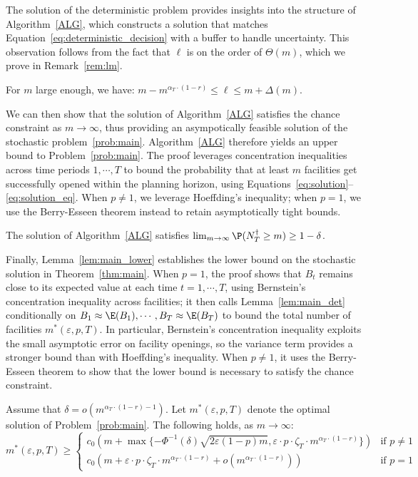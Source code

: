 \documentclass[blindrev]{informs3noheader}
\begin{document}
The solution of the deterministic problem provides insights into the structure of Algorithm~\ref{ALG}, which constructs a solution that matches Equation~\eqref{eq:deterministic_decision} with a buffer to handle uncertainty. This observation follows from the fact that $\ell$ is on the order of $\Theta(m)$, which we prove in Remark~\ref{rem:lm}.
\begin{remark}\label{rem:lm}
 For $m$ large enough, we have: $m- m^{\alpha_T \cdot (1-r)} \leq \ell\leq m + \Delta(m)$.
\end{remark}

We can then show that the solution of Algorithm~\ref{ALG} satisfies the chance constraint as $m\to\infty$, thus providing an asympotically feasible solution of the stochastic problem~\eqref{prob:main}. Algorithm~\ref{ALG} therefore yields an upper bound to Problem~\eqref{prob:main}. The proof leverages concentration inequalities across time periods $1,\cdots,T$  to bound the probability that at least $m$ facilities get successfully opened within the planning horizon, using Equations~\eqref{eq:solution}--\eqref{eq:solution_eq}. When $p\neq 1$, we leverage Hoeffding's inequality; when $p=1$, we use the Berry-Esseen theorem instead to retain asymptotically tight bounds.

\begin{lemma}\label{lem:main_feasible}
The solution of Algorithm~\ref{ALG} satisfies $\lim_{m \to \infty} \P(N^\dagger_T \geq m) \geq 1-\delta$.
\end{lemma}

Finally, Lemma~\ref{lem:main_lower} establishes the lower bound on the stochastic solution in Theorem~\ref{thm:main}. When $p=1$, the proof shows that $B_t$ remains close to its expected value at each time $t=1,\cdots,T$, using Bernstein's concentration inequality across facilities; it then calls Lemma~\ref{lem:main_det} conditionally on $B_1\approx\E(B_1),\cdots,B_T\approx\E(B_T)$ to bound the total number of facilities $m^*(\varepsilon, p,T)$. In particular, Bernstein's concentration inequality exploits the small asymptotic error on facility openings, so the variance term provides a stronger bound than with Hoeffding's inequality.  When $p\neq1$, it uses the Berry-Esseen theorem to show that the lower bound is necessary to satisfy the chance constraint.

\begin{lemma}\label{lem:main_lower}
Assume that $\delta = o\left(m^{\alpha_T\cdot(1-r)-1}\right)$. Let $m^*(\varepsilon, p,T)$ denote the optimal solution of Problem~\eqref{prob:main}. The following holds, as $m \to \infty$:
\[m^*(\varepsilon, p,T) \geq   \begin{cases}
c_0\left(m +\max\{-\Phi^{-1}(\delta)\sqrt{2\varepsilon(1-p)m},\varepsilon\cdot p\cdot\zeta_T\cdot m^{\alpha_T\cdot(1-r)}\}\right) & \text{if }p \neq 1\\
  c_0\left(m + \varepsilon\cdot p\cdot\zeta_T\cdot m^{\alpha_T\cdot(1-r)} +  o\left(m^{\alpha_T\cdot(1-r)}\right)\right) & \text{if }p=1
\end{cases}\]
\end{lemma}
\end{document}
